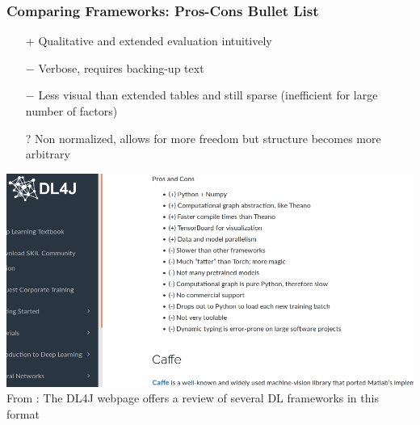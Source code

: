 \documentclass[hyperref={pdfpagelabels=false}]{beamer}
\begin{document}
      \begin{frame}
        \frametitle{Comparing Frameworks: Pros-Cons Bullet List}
               \begin{itemize}
               \item[+]   \scriptsize{Qualitative and extended evaluation intuitively}
               \item[$-$] \scriptsize{Verbose, requires backing-up text}
               \item[$-$] \scriptsize{Less visual than extended tables and still sparse (inefficient for large number of factors)}
               \item[?] \scriptsize{Non normalized, allows for more freedom but structure becomes more arbitrary}
               \end{itemize}
               \vspace{0mm}
               \includegraphics[scale=0.32]{pros_cons_list.png}
               \centering
               \\\tiny{From \cite{dl4j-review}: The DL4J webpage offers a review of several DL frameworks in this format}

               \vspace{6mm}
     \end{frame}
\end{document}
